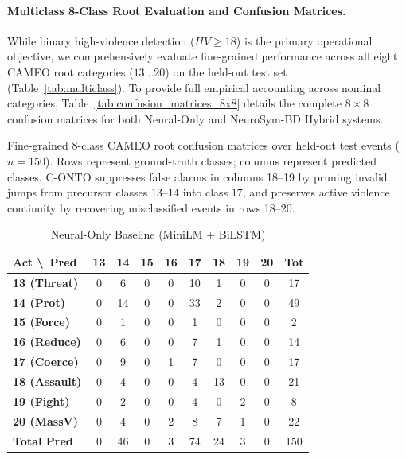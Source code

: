 \documentclass[11pt,a4paper]{article}
\begin{document}
\paragraph{Multiclass 8-Class Root Evaluation and Confusion Matrices.}
While binary high-violence detection ($HV \ge 18$) is the primary operational objective, we comprehensively evaluate fine-grained performance across all eight CAMEO root categories ($13 \dots 20$) on the held-out test set (Table~\ref{tab:multiclass}).
To provide full empirical accounting across nominal categories, Table~\ref{tab:confusion_matrices_8x8} details the complete $8 \times 8$ confusion matrices for both Neural-Only and NeuroSym-BD Hybrid systems.

\begin{table}[t]
\centering
\small
\caption{Fine-grained 8-class CAMEO root confusion matrices over held-out test events ($n=150$). Rows represent ground-truth classes; columns represent predicted classes. C-ONTO suppresses false alarms in columns 18--19 by pruning invalid jumps from precursor classes 13--14 into class 17, and preserves active violence continuity by recovering misclassified events in rows 18--20.}
\label{tab:confusion_matrices_8x8}
\begin{subtable}[t]{0.49\textwidth}
\centering
\caption{Neural-Only Baseline (MiniLM + BiLSTM)}
\label{tab:cm_neural}
\setlength{\tabcolsep}{3.5pt}
\begin{tabular}{lcccccccc|c}
\toprule
\textbf{Act \textbackslash\ Pred} & \textbf{13} & \textbf{14} & \textbf{15} & \textbf{16} & \textbf{17} & \textbf{18} & \textbf{19} & \textbf{20} & \textbf{Tot} \\
\midrule
\textbf{13 (Threat)}  & 0 & 6  & 0 & 0 & 10 & 1  & 0 & 0 & 17 \\
\textbf{14 (Prot)}    & 0 & 14 & 0 & 0 & 33 & 2  & 0 & 0 & 49 \\
\textbf{15 (Force)}   & 0 & 1  & 0 & 0 & 1  & 0  & 0 & 0 & 2  \\
\textbf{16 (Reduce)}  & 0 & 6  & 0 & 0 & 7  & 1  & 0 & 0 & 14 \\
\textbf{17 (Coerce)}  & 0 & 9  & 0 & 1 & 7  & 0  & 0 & 0 & 17 \\
\textbf{18 (Assault)} & 0 & 4  & 0 & 0 & 4  & 13 & 0 & 0 & 21 \\
\textbf{19 (Fight)}   & 0 & 2  & 0 & 0 & 4  & 0  & 2 & 0 & 8  \\
\textbf{20 (MassV)}   & 0 & 4  & 0 & 2 & 8  & 7  & 1 & 0 & 22 \\
\midrule
\textbf{Total Pred}   & 0 & 46 & 0 & 3 & 74 & 24 & 3 & 0 & 150 \\

\end{tabular}
\end{subtable}
\end{table}
\end{document}
